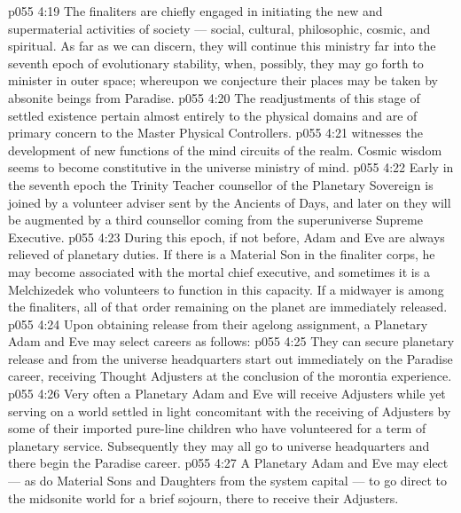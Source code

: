 \vs p055 4:19 The finaliters are chiefly engaged in initiating the new and supermaterial activities of society --- social, cultural, philosophic, cosmic, and spiritual. As far as we can discern, they will continue this ministry far into the seventh epoch of evolutionary stability, when, possibly, they may go forth to minister in outer space; whereupon we conjecture their places may be taken by absonite beings from Paradise.
\vs p055 4:20 \bibnobreakspace {} The readjustments of this stage of settled existence pertain almost entirely to the physical domains and are of primary concern to the Master Physical Controllers.
\vs p055 4:21 \bibnobreakspace {} witnesses the development of new functions of the mind circuits of the realm. Cosmic wisdom seems to become constitutive in the universe ministry of mind.
\vs p055 4:22 \bibnobreakspace {} Early in the seventh epoch the Trinity Teacher counsellor of the Planetary Sovereign is joined by a volunteer adviser sent by the Ancients of Days, and later on they will be augmented by a third counsellor coming from the superuniverse Supreme Executive.
\vs p055 4:23 During this epoch, if not before, Adam and Eve are always relieved of planetary duties. If there is a Material Son in the finaliter corps, he may become associated with the mortal chief executive, and sometimes it is a Melchizedek who volunteers to function in this capacity. If a midwayer is among the finaliters, all of that order remaining on the planet are immediately released.
\vs p055 4:24 \pc Upon obtaining release from their agelong assignment, a Planetary Adam and Eve may select careers as follows:
\vs p055 4:25 \bibnobreakspace They can secure planetary release and from the universe headquarters start out immediately on the Paradise career, receiving Thought Adjusters at the conclusion of the morontia experience.
\vs p055 4:26 \bibnobreakspace Very often a Planetary Adam and Eve will receive Adjusters while yet serving on a world settled in light concomitant with the receiving of Adjusters by some of their imported pure\hyp{}line children who have volunteered for a term of planetary service. Subsequently they may all go to universe headquarters and there begin the Paradise career.
\vs p055 4:27 \bibnobreakspace A Planetary Adam and Eve may elect --- as do Material Sons and Daughters from the system capital --- to go direct to the midsonite world for a brief sojourn, there to receive their Adjusters.
